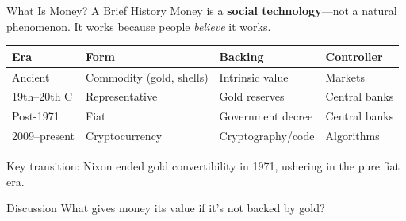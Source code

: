 ﻿\documentclass[aspectratio=169,11pt]{beamer}
\begin{document}
\begin{frame}{What Is Money? A Brief History}
Money is a \textbf{social technology}---not a natural phenomenon. It works because people \emph{believe} it works.

\vspace{0.3em}
\begin{table}[h]
\centering
\footnotesize
\begin{tabular}{@{}llll@{}}
\toprule
\textbf{Era} & \textbf{Form} & \textbf{Backing} & \textbf{Controller} \\
\midrule
Ancient & Commodity (gold, shells) & Intrinsic value & Markets \\
19th--20th C & Representative & Gold reserves & Central banks \\
Post-1971 & Fiat & Government decree & Central banks \\
2009--present & Cryptocurrency & Cryptography/code & Algorithms \\
\bottomrule
\end{tabular}
\end{table}

\vspace{0.3em}
Key transition: Nixon ended gold convertibility in 1971, ushering in the pure fiat era.

\begin{alertblock}{Discussion}
What gives money its value if it's not backed by gold?
\end{alertblock}
\end{frame}
\end{document}
